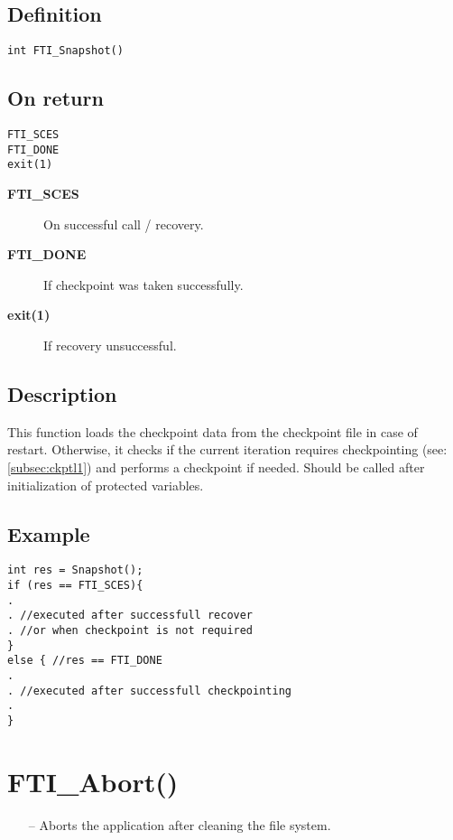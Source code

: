 \documentclass{refrep}
\begin{document}
\subsection*{Definition}
\begin{lstlisting}[frame=single]
int FTI_Snapshot()
\end{lstlisting}
\subsection*{On return}
\begin{lstlisting}[frame=single]
FTI_SCES
FTI_DONE
exit(1)
\end{lstlisting}
\begin{description}
\item[\textbf{FTI\_SCES}] On successful call / recovery.
\item[\textbf{FTI\_DONE}] If checkpoint was taken successfully.
\item[\textbf{exit(1)}] If recovery unsuccessful.
\end{description}
\subsection*{Description}
This function loads the checkpoint data from the checkpoint file in case of restart. Otherwise, it checks if the current iteration requires checkpointing (see: \ref{subsec:ckptl1}) and performs a checkpoint if needed. Should be called after initialization of protected variables.
\subsection*{Example}
\begin{center}
\begin{lstlisting}[frame=single]
int res = Snapshot();
if (res == FTI_SCES){
.
. //executed after successfull recover
. //or when checkpoint is not required
}
else { //res == FTI_DONE
.
. //executed after successfull checkpointing
. 
}

\end{lstlisting}
\end{center}
\newpage
\section{\asciifamily FTI\_Abort()}\label{sec:abort}
\begin{framed}
\begin{itemize}
\item[--] Aborts the application after cleaning the file system.
\end{itemize}
\end{framed}
\end{document}
